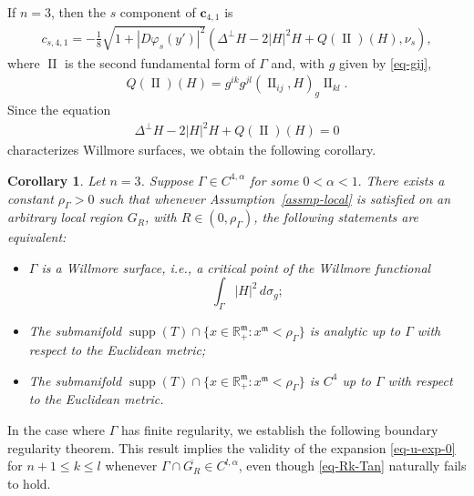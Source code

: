 \documentclass[11pt,reqno]{amsart}
\newcommand{\fm}{\mathfrak{m}}
\renewcommand{\leq}{\leqslant}
\newtheorem{corollary}[theorem]{Corollary}
\theoremstyle{definition}
\numberwithin{equation}{section}
\begin{document}
If $n=3$, then the $s$ component of $\mathbf{c}_{4,1}$ is
\begin{align}\label{eq-cs41}
    c_{s, 4,1} = -\frac{1}{8}\sqrt{1+|D\varphi_s(y')|^2} \left( \Delta^\perp H-2|H|^2 H + Q(\operatorname{II})(H), \nu_s \right),
\end{align}
where $\operatorname{II}$ is the second fundamental form of $\Gamma$ and, with $g$ given by \eqref{eq-gij},
\begin{align}
    Q(\operatorname{II})(H) = g^{ik}g^{jl} ( \operatorname{II}_{ij}, H )_g\operatorname{II}_{kl}.
\end{align}
  Since the equation
\begin{align}
    \Delta^\perp H - 2|H|^2 H + Q(\operatorname{II})(H) = 0
\end{align}
characterizes Willmore surfaces, we  obtain the following corollary.
\begin{corollary}
Let \(n = 3\). Suppose $\Gamma \in C^{4,\alpha}$ for some $0<\alpha<1.$ There exists a constant \(\rho_\Gamma > 0\) such that whenever Assumption~\ref{assmp-local} is satisfied on an arbitrary local region $G_R$, with $R\in (0, \rho_\Gamma)$,  the following statements are equivalent:
\begin{itemize}
    \item \(\Gamma\) is a Willmore surface, i.e., a critical point of the Willmore functional
    \[
    \int_\Gamma |H|^2 \, d\sigma_g;
    \]

    \item The submanifold \(\operatorname{supp}(T) \cap \bigl\{x\in \mathbb{R}^\fm_+ : x^\fm < \rho_\Gamma\bigr\}\) is analytic up to \(\Gamma\) with respect to the Euclidean metric;

    \item The submanifold \(\operatorname{supp}(T) \cap \bigl\{x\in \mathbb{R}^\fm_+ : x^\fm < \rho_\Gamma\bigr\}\) is \(C^{4}\) up to \(\Gamma\) with respect to the Euclidean metric.
\end{itemize}
\end{corollary}

In the case where $\Gamma$ has finite regularity, we establish the following boundary regularity theorem. This result implies the validity of the expansion \eqref{eq-u-exp-0} for $n+1 \leq k \leq l$ whenever $\Gamma \cap \overline{G_R} \in C^{l,\alpha}$, even though \eqref{eq-Rk-Tan} naturally fails to hold.
\end{document}
